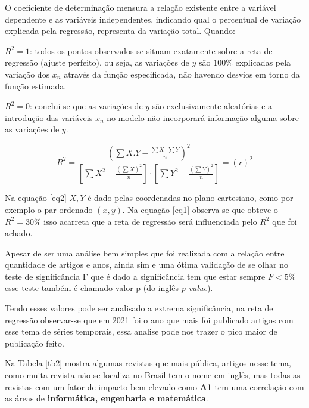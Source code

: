O coeficiente de determinação mensura a relação existente entre a variável dependente e as variáveis independentes, indicando qual o percentual de variação explicada pela regressão, representa da variação total. Quando:

$R^2=1$: todos os pontos observados se situam exatamente sobre a reta de regressão (ajuste perfeito), ou seja, as variações de $y$ são $100\%$ explicadas pela variação dos $x_n$ através da função especificada, não havendo desvios em torno da função estimada. 

$R^2=0$: conclui-se que as variações de $y$ são exclusivamente aleatórias e a introdução das variáveis $x_n$ no modelo não incorporará informação alguma sobre as variações de $y$.

\begin{equation}
	R^{2}=\frac{\left(\sum X . Y-\frac{\sum X \cdot \sum Y}{n}\right)^{2}}{\left[\sum X^{2}-\frac{\left(\sum X\right)^{2}}{n}\right] \cdot\left[\sum Y^{2}-\frac{\left(\sum Y\right)^{2}}{n}\right]}=(r)^{2}\label{eq2}
\end{equation}

Na equação \eqref{eq2} $X,Y$ é dado pelas coordenadas no plano cartesiano, como por exemplo o par ordenado $(x,y)$. 
Na equação \eqref{eq1} observa-se que obteve o $R^2=30\%$ isso acarreta que a reta de regressão será influenciada pelo $R^2$ que foi achado.

Apesar de ser uma análise bem simples que foi realizada com a relação entre quantidade de artigos e anos, ainda sim e uma ótima validação de se olhar no teste de significância F que é dado a significância tem que estar sempre $F<5\%$ esse teste também é chamado valor-p (do inglês \textit{p-value}).

Tendo esses valores pode ser analisado a extrema significância, na reta de regressão observar-se que em 2021 foi o ano que mais foi publicado artigos com esse tema de séries temporais, essa analise pode nos trazer o pico maior de publicação feito.




Na Tabela \ref{tb2} mostra algumas revistas que mais pública, artigos nesse tema, como muita revista não se localiza no Brasil tem o nome em inglês, mas todas as revistas com um fator de impacto bem elevado como \textbf{A1} tem uma correlação com as áreas de \textbf{informática, engenharia e matemática}.






